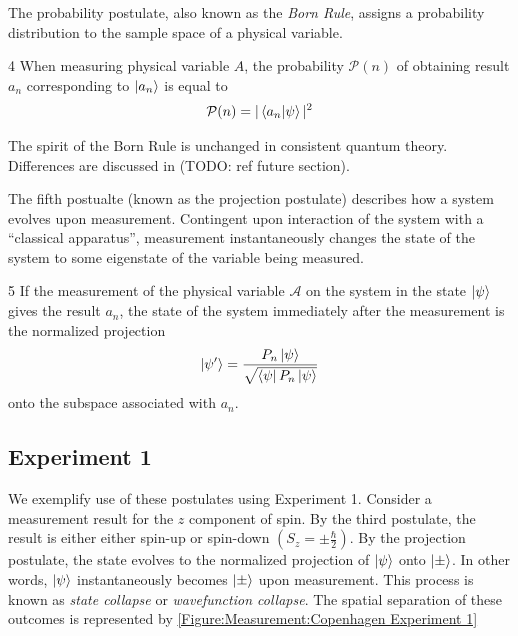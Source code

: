 The probability postulate, also known as the \textit{Born Rule}, assigns a probability distribution to the sample space of a physical variable.

\begin{Thm:Postulate}{4}
    When measuring physical variable $A$, the probability $\mathcal{P}(n)$ of obtaining result $a_n$ corresponding to $\ket{a_n}$  is equal to
     \begin{align}
        \mathcal{P}(n) = |\braket{a_n|\psi}|^2
    \end{align}
\end{Thm:Postulate}

The spirit of the Born Rule is unchanged in consistent quantum theory. Differences are discussed in (TODO: ref future section).


The fifth postualte (known as the projection postulate) describes how a system evolves upon measurement. Contingent upon interaction of the system with a ``classical apparatus'', measurement instantaneously changes the state of the system to some eigenstate of the variable being measured.

\begin{Thm:Postulate}{5} \label{projection postulate}
    If the measurement of the physical variable $\mathcal{A}$ on the system in the state $\ket{\psi}$ gives the result $a_n$, the state of the system immediately after the measurement is the normalized projection
    \begin{align}
        \ket{\psi^\prime} = \frac{P_n\ket{\psi}}{\sqrt{\bra{\psi}P_n\ket{\psi}
        }}
    \end{align}
    onto the subspace associated with $a_n$.
\end{Thm:Postulate}

\subsection{Experiment 1}\label{Standard Experiment 1}
We exemplify use of these postulates using Experiment 1. Consider a measurement result for the $z$ component of spin. By the third postulate, the result is either either spin-up or spin-down $\left( S_z = \pm \frac{\hbar}{2} \right)$. By the projection postulate, the state evolves to the normalized projection of $\ket{\psi}$ onto $\ket{\pm}$. In other words, $\ket{\psi}$ instantaneously becomes $\ket{\pm}$ upon measurement. This process is known as \textit{state collapse} or \textit{wavefunction collapse}. The spatial separation of these outcomes is represented by \autoref{Figure:Measurement:Copenhagen Experiment 1}

